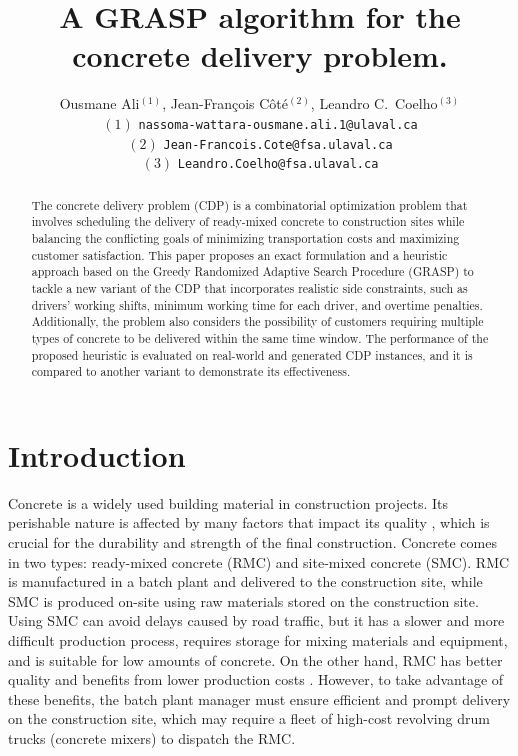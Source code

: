 \documentclass{article}
\title{A GRASP algorithm for the concrete delivery problem. }
\author{Ousmane Ali$^{(1)}$, Jean-Fran\c cois C\^ot\'e$^{(2)}$, Leandro C.~Coelho$^{(3)}$\\
 $(1)$ {\tt nassoma-wattara-ousmane.ali.1@ulaval.ca}\\
 $(2)$ {\tt Jean-Francois.Cote@fsa.ulaval.ca}\\
 $(3)$ {\tt Leandro.Coelho@fsa.ulaval.ca}\\
}
\begin{document}
\maketitle
\begin{abstract}
   The concrete delivery problem (CDP) is a combinatorial optimization problem that involves scheduling the delivery of ready-mixed concrete to construction sites while balancing the conflicting goals of minimizing transportation costs and maximizing customer satisfaction. This paper proposes an exact formulation and a heuristic approach based on the Greedy Randomized Adaptive Search Procedure (GRASP) to tackle a new variant of the CDP that incorporates realistic side constraints, such as drivers' working shifts, minimum working time for each driver, and overtime penalties. Additionally, the problem also considers the possibility of customers requiring multiple types of concrete to be delivered within the same time window. The performance of the proposed heuristic is evaluated on real-world and generated CDP instances, and it is compared to another variant to demonstrate its effectiveness.
    
\end{abstract}



\section{Introduction}
\label{sec:intro}
Concrete is a widely used building material in construction projects. Its perishable nature is affected by many factors that impact its quality \citep{sinha_quality_2021}, which is crucial for the durability and strength of the final construction. Concrete comes in two types: ready-mixed concrete (RMC) and site-mixed concrete (SMC). RMC is manufactured in a batch plant and delivered to the construction site, while SMC is produced on-site using raw materials stored on the construction site. Using SMC can avoid delays caused by road traffic, but it has a slower and more difficult production process, requires storage for mixing materials and equipment, and is suitable for low amounts of concrete. On the other hand, RMC has better quality and benefits from lower production costs \citep{muresan_comparing}. However, to take advantage of these benefits, the batch plant manager must ensure efficient and prompt delivery on the construction site, which may require a fleet of high-cost revolving drum trucks (concrete mixers) to dispatch the RMC.
\end{document}
